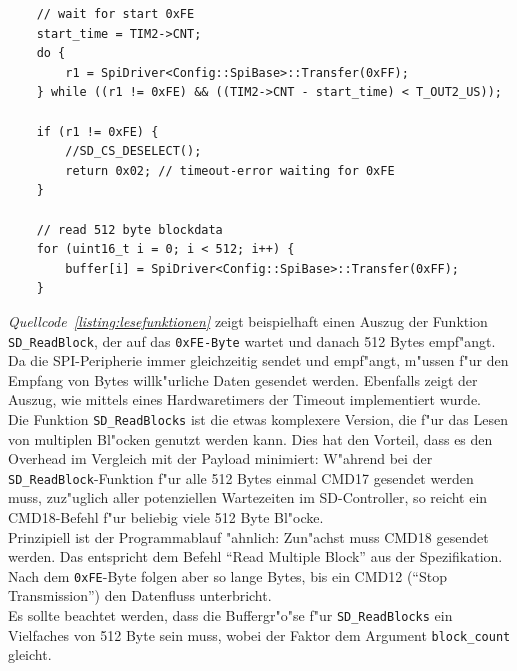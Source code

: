 \documentclass[11pt]{article}
\newcommand*{\coderef}[1]{\textit{Quellcode~\ref{#1}}}
\newcommand{\cpp}[1]{\texttt{#1}}
\begin{document}
\begin{listing}[H]
    \begin{verbatim}
    // wait for start 0xFE
    start_time = TIM2->CNT;
    do {
        r1 = SpiDriver<Config::SpiBase>::Transfer(0xFF);
    } while ((r1 != 0xFE) && ((TIM2->CNT - start_time) < T_OUT2_US));

    if (r1 != 0xFE) {
        //SD_CS_DESELECT();
        return 0x02; // timeout-error waiting for 0xFE
    }

    // read 512 byte blockdata
    for (uint16_t i = 0; i < 512; i++) {
        buffer[i] = SpiDriver<Config::SpiBase>::Transfer(0xFF);
    }

    \end{verbatim}
\caption{Auszug aus der Funktion \cpp{SD_ReadBlock}}
\label{listing:lesefunktionen}
\end{listing}

\coderef{listing:lesefunktionen} zeigt beispielhaft einen Auszug der Funktion \cpp{SD_ReadBlock}, 
der auf das \texttt{0xFE-Byte} wartet und danach 512 Bytes empf"angt. Da die SPI-Peripherie
immer gleichzeitig sendet und empf"angt, m"ussen f"ur den Empfang von Bytes willk"urliche 
Daten gesendet werden. Ebenfalls zeigt der Auszug, wie mittels eines Hardwaretimers der Timeout 
implementiert wurde. \\
Die Funktion \cpp{SD_ReadBlocks} ist die etwas komplexere Version, die f"ur
das Lesen von multiplen Bl"ocken genutzt werden kann. Dies hat den Vorteil,
dass es den Overhead im Vergleich mit der Payload minimiert: W"ahrend bei der 
\cpp{SD_ReadBlock}-Funktion f"ur alle 512 Bytes einmal CMD17 gesendet 
werden muss, zuz"uglich aller potenziellen Wartezeiten im SD-Controller, so reicht
ein CMD18-Befehl f"ur beliebig viele 512 Byte Bl"ocke.\\
Prinzipiell ist der Programmablauf "ahnlich: Zun"achst muss CMD18 gesendet werden.
Das entspricht dem Befehl \enquote{Read Multiple Block} aus der Spezifikation.
Nach dem \texttt{0xFE}-Byte folgen aber so lange Bytes, bis ein CMD12 (\enquote{Stop Transmission})
den Datenfluss unterbricht. \\
Es sollte beachtet werden, dass die Buffergr"o"se f"ur \cpp{SD_ReadBlocks} ein Vielfaches 
von 512 Byte sein muss, wobei der Faktor dem Argument \texttt{block\_count} gleicht. 
\end{document}
